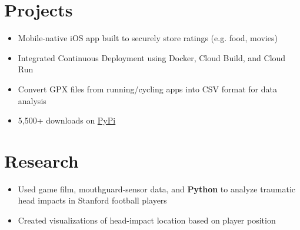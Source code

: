\documentclass[]{houston-ethan-resume}
\begin{document}
\begin{minipage}[t]{0.66\textwidth}
	\sectionsep

\section{Projects}
	\begin{itemize}[noitemsep,topsep=0pt]
	\itemsep-0.2em 
	\item Mobile-native iOS app built to securely store ratings (e.g. food, movies)
	\item Integrated Continuous Deployment using Docker, Cloud Build, and Cloud Run
	\end{itemize}

	\sectionsep

	\begin{itemize}[noitemsep,topsep=0pt]
	\itemsep-0.2em 
	\item Convert GPX files from running/cycling apps into CSV format for data analysis
	\item 5,500+ downloads on \href{https://pypi.org/project/gpx-csv-converter/}{PyPi}
	\end{itemize}

	\sectionsep


\section{Research}
	\begin{itemize}[noitemsep,topsep=0pt]
	\itemsep-0.2em 
	\item Used game film, mouthguard-sensor data, and \textbf{Python} to analyze traumatic head impacts in Stanford football players
	\item Created visualizations of head-impact location based on player position
	\end{itemize}

	\sectionsep

\end{minipage}
\end{document}
